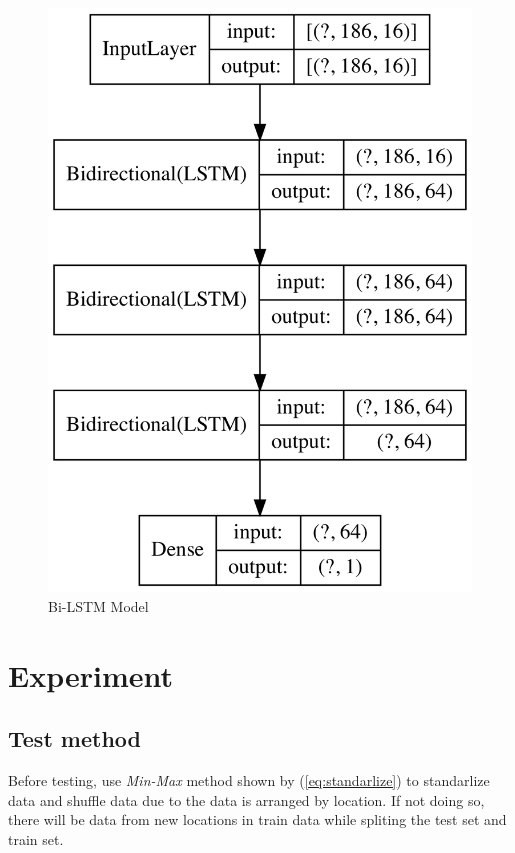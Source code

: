 \documentclass[conference]{IEEEtran}
\begin{document}
\begin{figure}[htbp]
  \centerline{\includegraphics[width=\linewidth]{figures/Model_figure.png}}
  \caption{Bi-LSTM Model}
  \label{fig:model}
\end{figure}

\section{Experiment} \label{sec:ex}
\subsection{Test method}
Before testing, use \textit{Min-Max} method shown by (\ref{eq:standarlize}) to standarlize data and shuffle data due to the data is arranged by location. If not doing so, there will be data from new locations in train data while spliting the test set and train set.
\end{document}
